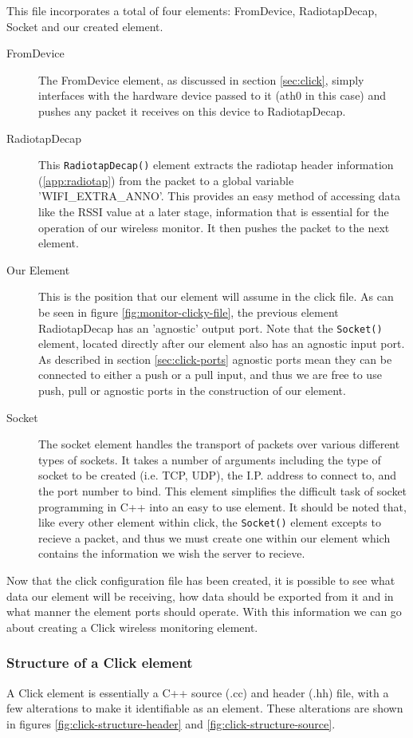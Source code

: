 	    This file incorporates a total of four elements: FromDevice, RadiotapDecap, Socket and our created element. 
	    \begin{description}
	     \item[FromDevice] The FromDevice element, as discussed in section \ref{sec:click}, simply interfaces with the hardware device passed to it (ath0 in this case) and pushes any packet it receives on this device to RadiotapDecap.
	     \item[RadiotapDecap] This \texttt{RadiotapDecap()} element extracts the radiotap header information (\ref{app:radiotap}) from the packet to a global variable 'WIFI\_EXTRA\_ANNO'. This provides an easy method of accessing data like the RSSI value at a later stage, information that is essential for the operation of our wireless monitor. It then pushes the packet to the next element. 
	     \item[Our Element] This is the position that our element will assume in the click file. As can be seen in figure \ref{fig:monitor-clicky-file}, the previous element RadiotapDecap has an 'agnostic' output port. Note that the \texttt{Socket()} element, located directly after our element also has an agnostic input port. As described in section \ref{sec:click-ports} agnostic ports mean they can be connected to either a push or a pull input, and thus we are free to use push, pull or agnostic ports in the construction of our element.
	     \item[Socket] The socket element handles the transport of packets over various different types of sockets. It takes a number of arguments including the type of socket to be created (i.e. TCP, UDP), the I.P. address to connect to, and the port number to bind. This element simplifies the difficult task of socket programming in C++ into an easy to use element. It should be noted that, like every other element within click, the \texttt{Socket()} element excepts to recieve a packet, and thus we must create one within our element which contains the information we wish the server to recieve.   
 	    \end{description}

	    Now that the click configuration file has been created, it is possible to see what data our element will be receiving, how data should be exported from it and in what manner the element ports should operate. With this information we can go about creating a Click wireless monitoring element.

        \subsubsection{Structure of a Click element}
            A Click element is essentially a C++ source (.cc) and header (.hh) file, with a few alterations to make it identifiable as an element. These alterations are shown in figures \ref{fig:click-structure-header} and \ref{fig:click-structure-source}.

